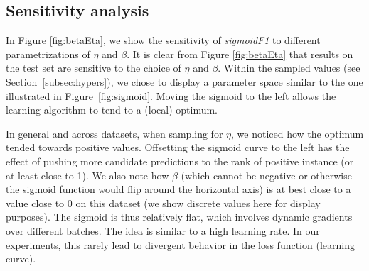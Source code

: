 \subsection{Sensitivity analysis}

In Figure \ref{fig:betaEta}, we show the sensitivity of \emph{sigmoidF1} to different parametrizations of $\eta$ and $\beta$. It is clear from Figure \ref{fig:betaEta} that results on the test set are sensitive to the choice of $\eta$ and $\beta$. Within the sampled values (see Section~\ref{subsec:hypers}), we chose to display a parameter space similar to the one illustrated in Figure~\ref{fig:sigmoid}. Moving the sigmoid to the left allows the learning algorithm to tend to a (local) optimum.

In general and across datasets, when sampling for $\eta$, we noticed how the optimum tended towards positive values. Offsetting the sigmoid curve to the left has the effect of pushing more candidate predictions to the rank of positive instance (or at least close to 1). We also note how $\beta$ (which cannot be negative or otherwise the sigmoid function would flip around the horizontal axis) is at best close to a value close to 0 on this dataset (we show discrete values here for display purposes). The sigmoid is thus relatively flat, which involves dynamic gradients over different batches. The idea is similar to a high learning rate. In our experiments, this rarely lead to divergent behavior in the loss function (learning curve).







